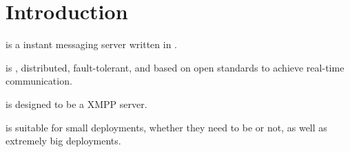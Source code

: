 \chapter{Introduction}
\label{intro}




\ejabberd{} is a  instant messaging server written in .

\ejabberd{} is , distributed, fault-tolerant, and based on open standards to achieve real-time communication.

\ejabberd{} is designed to be a  XMPP server.

\ejabberd{} is suitable for small deployments, whether they need to be  or not, as well as extremely big deployments.





